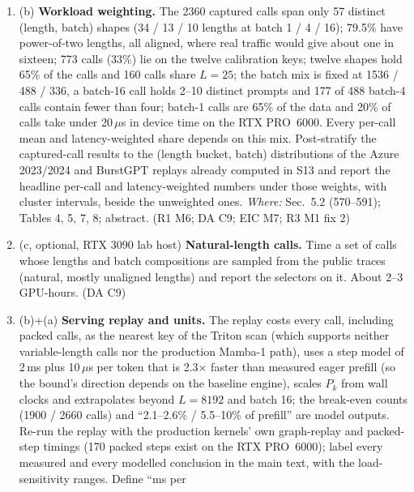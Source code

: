 \documentclass[11pt]{article}
\begin{document}
\begin{enumerate}[label=M6\alph*.]
  \item (b) \textbf{Workload weighting.} The 2360 captured calls span only 57
        distinct (length, batch) shapes (34 / 13 / 10 lengths at batch 1 / 4 /
        16); 79.5\% have power-of-two lengths, all aligned, where real traffic
        would give about one in sixteen; 773 calls (33\%) lie on the twelve
        calibration keys; twelve shapes hold 65\% of the calls and 160 calls
        share $L=25$; the batch mix is fixed at 1536 / 488 / 336, a batch-16
        call holds 2--10 distinct prompts and 177 of 488 batch-4 calls contain
        fewer than four; batch-1 calls are 65\% of the data and 20\% of calls
        take under 20\,$\mu$s in device time on the RTX PRO~6000. Every
        per-call mean and latency-weighted share depends on this mix.
        Post-stratify the captured-call results to the (length bucket, batch)
        distributions of the Azure 2023/2024 and BurstGPT replays already
        computed in S13 and report the headline per-call and latency-weighted
        numbers under those weights, with cluster intervals, beside the
        unweighted ones. \emph{Where:} Sec.~5.2 (570--591); Tables 4, 5, 7, 8;
        abstract. (R1 M6; DA C9; EIC M7; R3 M1 fix 2)
  \item (c, optional, RTX 3090 lab host) \textbf{Natural-length calls.} Time a
        set of calls whose lengths and batch compositions are sampled from the
        public traces (natural, mostly unaligned lengths) and report the
        selectors on it. About 2--3 GPU-hours. (DA C9)
  \item (b)+(a) \textbf{Serving replay and units.} The replay costs every call,
        including packed calls, as the nearest key of the Triton scan (which
        supports neither variable-length calls nor the production Mamba-1
        path), uses a step model of 2\,ms plus 10\,$\mu$s per token that is
        2.3$\times$ faster than measured eager prefill (so the bound's
        direction depends on the baseline engine), scales $P_k$ from wall
        clocks and extrapolates beyond $L=8192$ and batch 16; the break-even
        counts (1900 / 2660 calls) and ``2.1--2.6\% / 5.5--10\% of prefill''
        are model outputs. Re-run the replay with the production kernels'
        own graph-replay and packed-step timings (170 packed steps exist on
        the RTX PRO~6000); label every measured and every modelled conclusion
        in the main text, with the load-sensitivity ranges. Define ``ms per

\end{enumerate}
\end{document}
